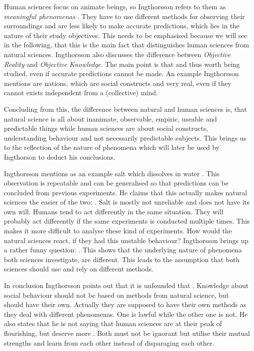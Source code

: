 \documentclass[11pt]{scrartcl}
\begin{document}
Human sciences focus on animate beings, so Ingthorsson refers to them as \textit{meaningful phenomenas} \cite[p. 27]{ingtho}. They have to use different methods for observing their surroundings and are less likely to make accurate predictions, which lies in the nature of their study objectives. This needs to be emphasised because we will see in the following, that this is the main fact that distinguishes human sciences from natural sciences. Ingthorsson also discusses the difference between \textit{Objective Reality} and \textit{Objective Knowledge}. The main point is that  \cite[p. 37]{ingtho} and thus worth being studied, even if accurate predictions cannot be made. An example Ingthorsson mentions are nations, which are social constructs and very real, even if they cannot exists independent from a (collective) mind.

Concluding from this, the difference between natural and human sciences is, that natural science is all about inanimate, observable, empiric, useable and predictable things while human sciences are about social constructs, understanding behaviour and not necessarily predictable subjects. This brings us to the reflection of the nature of phenomena which will later be used by Ingthorson to deduct his conclusions.

Ingthorsson mentions as an example salt which dissolves in water \cite[p. 32]{ingtho}. This observation is repeatable and can be generalised so that predictions can be concluded from previous experiments. He claims that this actually makes natural sciences the easier of the two:  \cite[p. 32]{ingtho}. Salt is mostly not unreliable and does not have its own will. Humans tend to act differently in the same situation. They will probably act differently if the same experiments is conducted multiple times. This makes it more difficult to analyse these kind of experiments. How would the natural sciences react, if they had this unstable behaviour? Ingthorsson brings up a rather funny question:  \cite[p. 33]{ingtho}. This shows that the underlying nature of phenomena both sciences investigate, are different. This leads to the assumption that both sciences should use and rely on different methods.

In conclusion Ingthorsson points out that it is unfounded that  \cite[p. 40]{ingtho}. Knowledge about social behaviour should not be based on methods from natural science, but should have their own. Actually they are supposed to have their own methods as they deal with different phenomenas. One is lawful while the other one is not. He also states that he is not saying that human sciences are at their peak of flourishing, but deserve more  \cite[p. 41]{ingtho}. Both must not be ignorant but utilise their mutual strengths and learn from each other instead of disparaging each other.
\bigbreak
\end{document}

